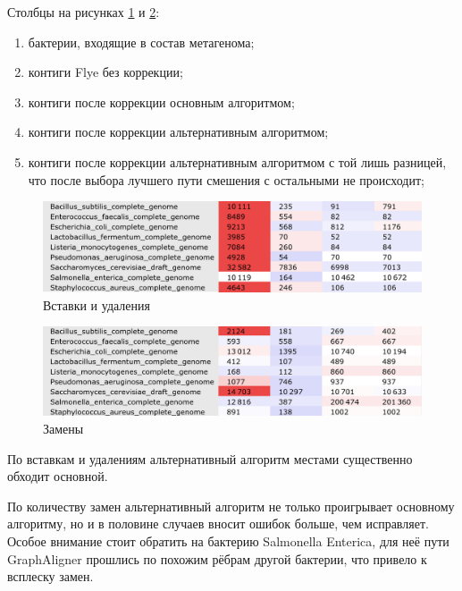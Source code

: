 \documentclass[14pt]{matmex-diploma-custom}
\begin{document}
Столбцы на рисунках \ref{fig:indels_ga} и \ref{fig:mismatches_ga}:
\begin{enumerate}
    \item бактерии, входящие в состав метагенома;
    \item контиги Flye без коррекции;
    \item контиги после коррекции основным алгоритмом;
    \item контиги после коррекции альтернативным алгоритмом;
    \item контиги после коррекции альтернативным алгоритмом с той лишь разницей, что после выбора лучшего пути смешения с остальными не происходит;
\end{enumerate}

\begin{figure}[h]
    \centering
    \includegraphics[width=1\textwidth]{indels_ga_full.png}
    \caption{Вставки и удаления}
    \label{fig:indels_ga}
\end{figure}

\begin{figure}[h]
    \centering
    \includegraphics[width=1\textwidth]{mismatches_ga_full.png}
    \caption{Замены}
    \label{fig:mismatches_ga}
\end{figure}

По вставкам и удалениям альтернативный алгоритм местами существенно обходит основной.

По количеству замен альтернативный алгоритм не только проигрывает основному алгоритму, но и в половине случаев вносит ошибок больше, чем исправляет. Особое внимание стоит обратить на бактерию Salmonella Enterica, для неё пути GraphAligner прошлись по похожим рёбрам другой бактерии, что привело к всплеску замен.

\newpage
\end{document}
